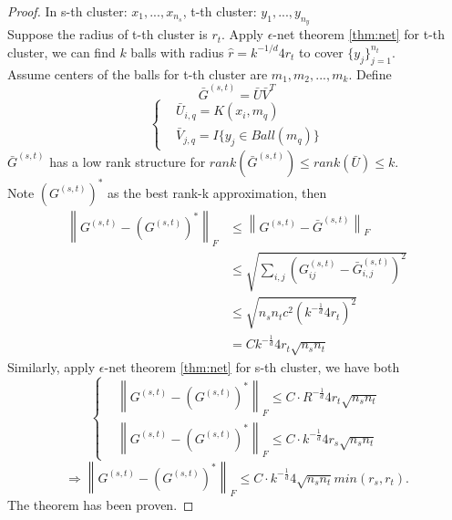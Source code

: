 \documentclass[12pt, a4paper, oneside]{article}
\begin{document}
\begin{proof}
	In s-th cluster: $x_1, ..., x_{n_s}$, t-th cluster: $y_1, ..., y_{n_y}$ \\
	Suppose the radius of t-th cluster is $r_t$. Apply $\epsilon$-net theorem \ref{thm:net} for t-th cluster, we can find $k$ balls with radius $\hat r=k^{-1/d}4r_t$ to cover $\{y_j\}_{j = 1}^{n_t}$. \\
	Assume centers of the balls for t-th cluster are $m_1, m_2,..., m_k$. Define 
	\begin{equation}
	\bar G^{(s,t)} = \bar U \bar V^T
	\end{equation}
\begin{equation}
	\left\{
	\begin{aligned}
		&\bar{U}_{i, q} = K(x_{i}, m_{q}) \\
		&\bar{V}_{j, q}= I\{y_{j} \in Ball(m_q)\}
	\end{aligned}
	\right.
\end{equation}
$\bar G^{(s,t)}$ has a low rank structure for $rank(\bar G^{(s,t)}) \leq rank(\bar U) \leq k$. \\
Note $\left(G^{(s, t)}\right)^{*}$ as the best rank-k approximation, then
\begin{equation}
	\begin{aligned}
		\left\|G^{(s, t)}-\left(G^{(s, t)}\right)^{*}\right\|_{F} & \leqslant\left\|G^{(s, t)}-\bar{G}^{(s, t)}\right\|_{F} \\
		& \leqslant \sqrt{\sum_{i, j}\left(G_{i j}^{(s, t)}-\bar{G}_{i, j}^{(s, t)}\right)^{2}} \\
		& \leqslant \sqrt{n_{s} n_{t} c^{2}\left(k^{-\frac{1}{d}} 4 r_{t}\right)^{2}} \\
		&=C k^{-\frac{1}{d}} 4 r_{t} \sqrt{n_{s} n_{t}}
	\end{aligned}
\end{equation}
Similarly, apply $\epsilon$-net theorem \ref{thm:net} for s-th cluster, we have both
\begin{equation}
	\left\{
	\begin{aligned}
		&\left\|G^{(s, t)}-\left(G^{(s, t)}\right)^{*}\right\|_{F} \leqslant C \cdot R^{-\frac{1}{d}} 4 r_{t} \sqrt{n_{s} n_{t}} \\
		&\left\|G^{(s, t)}-\left(G^{(s, t)}\right)^{*}\right\|_{F} \leqslant C \cdot k^{-\frac{1}{d}} 4 r_{s} \sqrt{n_{s} n_{t}}
	\end{aligned}
	\right.
\end{equation}
\begin{equation}
	\Rightarrow \left\|G^{(s, t)}-\left(G^{(s, t)}\right)^{*}\right\|_{F} \leqslant C \cdot k^{-\frac{1}{d}} 4 \sqrt{n_{s} n_{t}} min(r_{s}, r_{t}).
\end{equation}
The theorem has been proven.
\end{proof}
\end{document}
